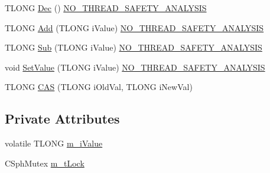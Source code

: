 \begin{DoxyCompactItemize}
\item 
T\-L\-O\-N\-G \hyperlink{classCSphAtomic__T_a088a34d1c9cf1fd9f4d9d5de98ed2432}{Dec} () \hyperlink{sphinxstd_8h_ab8ec653d80c013941ef73e4c80cd44cf}{N\-O\-\_\-\-T\-H\-R\-E\-A\-D\-\_\-\-S\-A\-F\-E\-T\-Y\-\_\-\-A\-N\-A\-L\-Y\-S\-I\-S}
\item 
T\-L\-O\-N\-G \hyperlink{classCSphAtomic__T_a04323470cf656e2864ee207c07751a29}{Add} (T\-L\-O\-N\-G i\-Value) \hyperlink{sphinxstd_8h_ab8ec653d80c013941ef73e4c80cd44cf}{N\-O\-\_\-\-T\-H\-R\-E\-A\-D\-\_\-\-S\-A\-F\-E\-T\-Y\-\_\-\-A\-N\-A\-L\-Y\-S\-I\-S}
\item 
T\-L\-O\-N\-G \hyperlink{classCSphAtomic__T_a5a15989b2407c8248ac89ffb0be6a4a3}{Sub} (T\-L\-O\-N\-G i\-Value) \hyperlink{sphinxstd_8h_ab8ec653d80c013941ef73e4c80cd44cf}{N\-O\-\_\-\-T\-H\-R\-E\-A\-D\-\_\-\-S\-A\-F\-E\-T\-Y\-\_\-\-A\-N\-A\-L\-Y\-S\-I\-S}
\item 
void \hyperlink{classCSphAtomic__T_ad7f418dda1db721a59e38ee336378bb8}{Set\-Value} (T\-L\-O\-N\-G i\-Value) \hyperlink{sphinxstd_8h_ab8ec653d80c013941ef73e4c80cd44cf}{N\-O\-\_\-\-T\-H\-R\-E\-A\-D\-\_\-\-S\-A\-F\-E\-T\-Y\-\_\-\-A\-N\-A\-L\-Y\-S\-I\-S}
\item 
T\-L\-O\-N\-G \hyperlink{classCSphAtomic__T_ad6128e8df7a10f5fb0273b7675ee5c8d}{C\-A\-S} (T\-L\-O\-N\-G i\-Old\-Val, T\-L\-O\-N\-G i\-New\-Val)
\end{DoxyCompactItemize}
\subsection*{Private Attributes}
\begin{DoxyCompactItemize}
\item 
volatile T\-L\-O\-N\-G \hyperlink{classCSphAtomic__T_a77e7e5bd9a16efeeea88d56b351df4fe}{m\-\_\-i\-Value}
\item 
C\-Sph\-Mutex \hyperlink{classCSphAtomic__T_a9edd4f1802870d4de39ae8c3707ac355}{m\-\_\-t\-Lock}
\end{DoxyCompactItemize}



